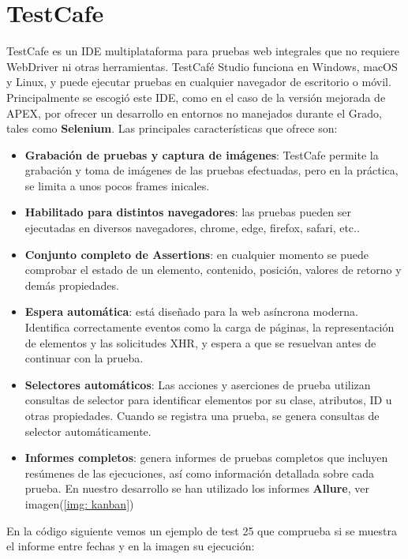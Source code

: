 \section{TestCafe}
TestCafe es un \acrshort{IDE} multiplataforma para pruebas web integrales que no requiere WebDriver ni otras herramientas. TestCafé Studio funciona en Windows, macOS y Linux, y puede ejecutar pruebas en cualquier navegador de escritorio o móvil. ~\cite{TestCodeGuide}
Principalmente se escogió este \acrshort{IDE}, como en el caso de la versión mejorada de \acrshort{APEX}, por ofrecer un desarrollo en entornos no manejados durante el Grado, tales como \textbf{Selenium}. 
Las principales características que ofrece son:
\begin{itemize}
	\item \textbf{Grabación de pruebas y captura de imágenes}: TestCafe permite la grabación y toma de imágenes de las pruebas efectuadas, pero en la práctica, se limita a unos pocos frames inicales.
	\item \textbf{Habilitado para distintos navegadores}: las pruebas pueden ser ejecutadas en diversos navegadores, chrome, edge, firefox, safari, etc..
	\item \textbf{Conjunto completo de Assertions}: en cualquier momento se puede comprobar el estado de un elemento, contenido, posición, valores de retorno y demás propiedades.
	\item \textbf{Espera automática}: está diseñado para la web asíncrona moderna. Identifica correctamente eventos como la carga de páginas, la representación de elementos y las solicitudes XHR, y espera a que se resuelvan antes de continuar con la prueba.
	\item \textbf{Selectores automáticos}: Las acciones y aserciones de prueba utilizan consultas de selector para identificar elementos por su clase, atributos, ID u otras propiedades. Cuando se registra una prueba, se genera consultas de selector automáticamente.
	\item \textbf{Informes completos}:  genera informes de pruebas completos que incluyen resúmenes de las ejecuciones, así como información detallada sobre cada prueba. En nuestro desarrollo se han utilizado los informes \textbf{Allure}, ver imagen(\ref{img: kanban})
\end{itemize}

En la código siguiente vemos un ejemplo de test 25 que comprueba si se muestra el informe entre fechas y en la imagen su ejecución:

